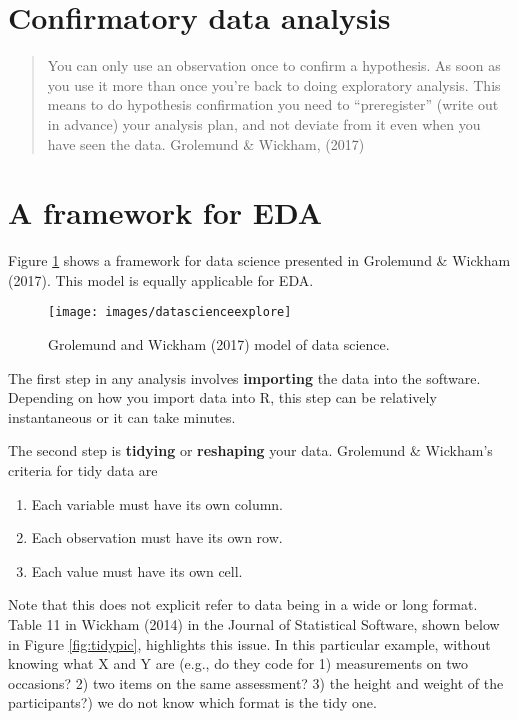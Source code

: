 \documentclass[
]{book}
\providecommand{\tightlist}{%
  \setlength{\itemsep}{0pt}\setlength{\parskip}{0pt}}
\begin{document}
\hypertarget{confirmatory-data-analysis}{%
\section{Confirmatory data analysis}\label{confirmatory-data-analysis}}

\begin{quote}
You can only use an observation once to confirm a hypothesis. As soon as you use it more than once you're back to doing exploratory analysis. This means to do hypothesis confirmation you need to ``preregister'' (write out in advance) your analysis plan, and not deviate from it even when you have seen the data. Grolemund \& Wickham, (2017)
\end{quote}

\hypertarget{a-framework-for-eda}{%
\section{A framework for EDA}\label{a-framework-for-eda}}

Figure \ref{fig:edamod} shows a framework for data science presented in Grolemund \& Wickham (2017). This model is equally applicable for EDA.

\begin{figure}
\texttt{[image: images/datascienceexplore]} \caption{Grolemund and Wickham (2017) model of data science.}\label{fig:edamod}
\end{figure}

The first step in any analysis involves \textbf{importing} the data into the software. Depending on how you import data into R, this step can be relatively instantaneous or it can take minutes.

The second step is \textbf{tidying} or \textbf{reshaping} your data. Grolemund \& Wickham's criteria for tidy data are

\begin{enumerate}
\def\labelenumi{\arabic{enumi}.}
\tightlist
\item
  Each variable must have its own column.
\item
  Each observation must have its own row.
\item
  Each value must have its own cell.
\end{enumerate}

Note that this does not explicit refer to data being in a wide or long format. Table 11 in Wickham (2014) in the Journal of Statistical Software, shown below in Figure \ref{fig:tidypic}, highlights this issue. In this particular example, without knowing what X and Y are (e.g., do they code for 1) measurements on two occasions? 2) two items on the same assessment? 3) the height and weight of the participants?) we do not know which format is the tidy one.
\end{document}

